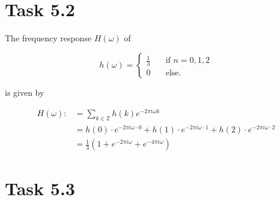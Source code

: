 \documentclass[12pt]{article}
\begin{document}
\section*{Task 5.2}
The frequency response $H(\omega)$ of

\[
h(\omega) =
    \begin{cases}
        \frac{1}{3} & \quad\text{if } n=0,1,2\\
        0 &\quad\text{else.}
    \end{cases}
\]

is given by

\begin{align*}
    H(\omega) :&= \sum_{k \in \mathbb{Z}} h(k)e^{-2 \pi i \omega k}\\
    &= h(0) \cdot e^{-2 \pi i \omega \cdot 0} + h(1) \cdot e^{-2 \pi i \omega \cdot 1} + h(2) \cdot e^{-2 \pi i \omega \cdot 2}\\
    &= \frac{1}{3} (1 + e^{-2 \pi i \omega} + e^{-4 \pi i \omega})
\end{align*}

\section*{Task 5.3}
\end{document}
